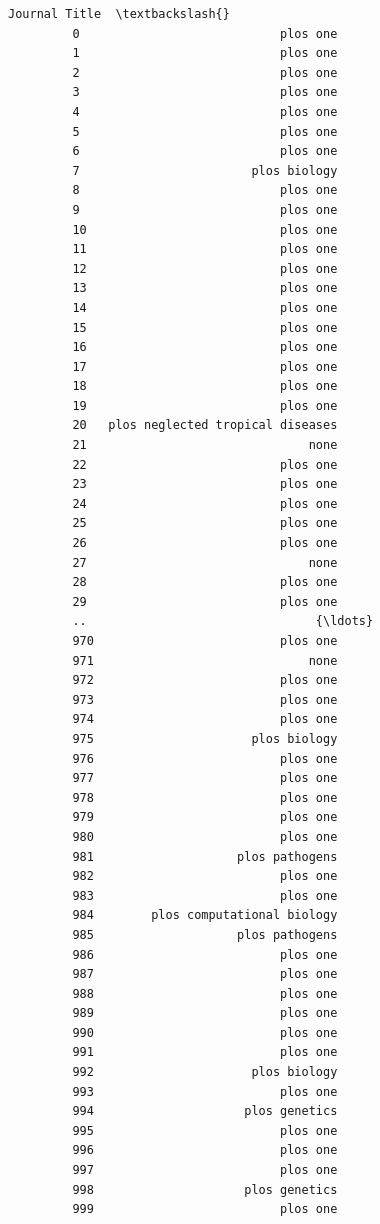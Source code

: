 \documentclass[11pt]{article}
\begin{document}
\begin{Verbatim}[commandchars=\\\{\}]
                                 Journal Title  \textbackslash{}
         0                            plos one   
         1                            plos one   
         2                            plos one   
         3                            plos one   
         4                            plos one   
         5                            plos one   
         6                            plos one   
         7                        plos biology   
         8                            plos one   
         9                            plos one   
         10                           plos one   
         11                           plos one   
         12                           plos one   
         13                           plos one   
         14                           plos one   
         15                           plos one   
         16                           plos one   
         17                           plos one   
         18                           plos one   
         19                           plos one   
         20   plos neglected tropical diseases   
         21                               none   
         22                           plos one   
         23                           plos one   
         24                           plos one   
         25                           plos one   
         26                           plos one   
         27                               none   
         28                           plos one   
         29                           plos one   
         ..                                {\ldots}   
         970                          plos one   
         971                              none   
         972                          plos one   
         973                          plos one   
         974                          plos one   
         975                      plos biology   
         976                          plos one   
         977                          plos one   
         978                          plos one   
         979                          plos one   
         980                          plos one   
         981                    plos pathogens   
         982                          plos one   
         983                          plos one   
         984        plos computational biology   
         985                    plos pathogens   
         986                          plos one   
         987                          plos one   
         988                          plos one   
         989                          plos one   
         990                          plos one   
         991                          plos one   
         992                      plos biology   
         993                          plos one   
         994                     plos genetics   
         995                          plos one   
         996                          plos one   
         997                          plos one   
         998                     plos genetics   
         999                          plos one   
         

\end{Verbatim}
\end{document}
